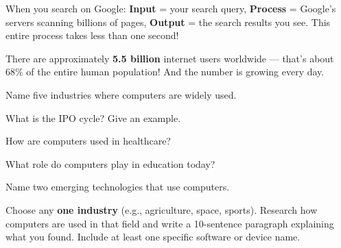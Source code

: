 
\begin{realworld}
When you search on Google: \textbf{Input} = your search query, \textbf{Process} = Google's servers scanning billions of pages, \textbf{Output} = the search results you see. This entire process takes less than one second!
\end{realworld}

\begin{funfact}
There are approximately \textbf{5.5 billion} internet users worldwide --- that's about 68\% of the entire human population! And the number is growing every day.
\end{funfact}

\begin{reviewqs}
  \item Name five industries where computers are widely used.
  \item What is the IPO cycle? Give an example.
  \item How are computers used in healthcare?
  \item What role do computers play in education today?
  \item Name two emerging technologies that use computers.
\end{reviewqs}

\begin{challenge}
Choose any \textbf{one industry} (e.g., agriculture, space, sports). Research how computers are used in that field and write a 10-sentence paragraph explaining what you found. Include at least one specific software or device name.
\end{challenge}
